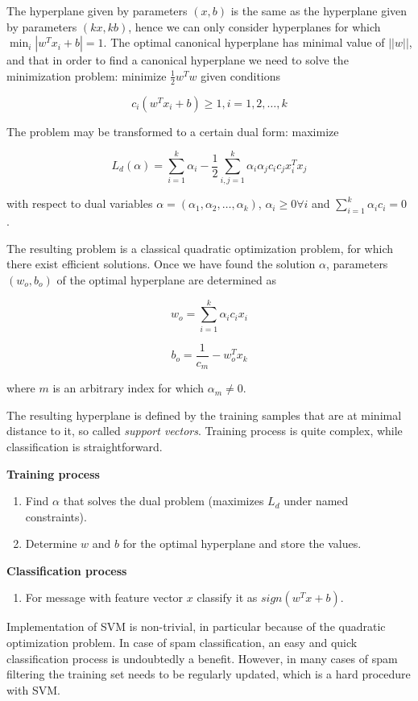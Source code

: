 \documentclass[12pt]{report}
\begin{document}
The hyperplane given by parameters $(x, b)$ is the same as the hyperplane given by parameters $(kx, kb)$, hence we can only consider hyperplanes for which $\min_i |w^T x_i + b| = 1$. The optimal canonical hyperplane has minimal value of $||w||$, and that in order to find a canonical hyperplane we need to solve the minimization problem: minimize $\frac{1}{2} w^T w$ given conditions

$$c_i(w^T x_i + b) \ge 1, i = 1, 2, \dots, k$$

The problem may be transformed to a certain dual form: maximize

$$L_d(\alpha) = \sum_{i = 1}^{k} \alpha_i - \frac{1}{2} \sum_{i, j = 1}^{k} \alpha_i \alpha_j c_i c_j x_i^T x_j$$

with respect to dual variables $\alpha = (\alpha_1, \alpha_2, \dots, \alpha_k)$, $\alpha_i \ge 0 \forall i$ and $\sum_{i = 1}^{k} \alpha_i c_i = 0$ \cite{Tretyakov}.

The resulting problem is a classical quadratic optimization problem, for which there exist efficient solutions. Once we have found the solution $\alpha$, parameters $(w_o, b_o)$ of the optimal hyperplane are determined as

$$w_o = \sum_{i = 1}^{k} \alpha_i c_i x_i$$

$$b_o = \frac{1}{c_m} - w_o^T x_k$$

where $m$ is an arbitrary index for which $\alpha_m \ne 0$.

The resulting hyperplane is defined by the training samples that are at minimal distance to it, so called \textit{support vectors}. Training process is quite complex, while classification is straightforward.

\textbf{Training process}

\begin{enumerate}
	\item Find $\alpha$ that solves the dual problem (maximizes $L_d$ under named
	constraints).
	\item Determine $w$ and $b$ for the optimal hyperplane and store the values.
\end{enumerate}

\textbf{Classification process}

\begin{enumerate}
	\item For message with feature vector $x$ classify it as $sign(w^T x + b)$.
\end{enumerate}

Implementation of SVM is non-trivial, in particular because of the quadratic optimization problem. In case of spam classification, an easy and quick classification process is undoubtedly a benefit. However, in many cases of spam filtering the training set needs to be regularly updated, which is a hard procedure with SVM.
\end{document}
